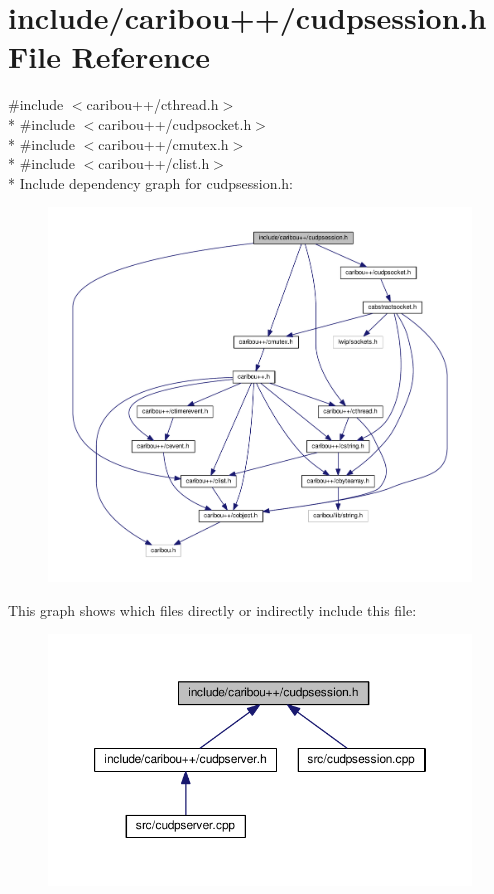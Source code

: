\section{include/caribou++/cudpsession.h File Reference}
\label{cudpsession_8h}
{\ttfamily \#include $<$caribou++/cthread.\-h$>$}\\*
{\ttfamily \#include $<$caribou++/cudpsocket.\-h$>$}\\*
{\ttfamily \#include $<$caribou++/cmutex.\-h$>$}\\*
{\ttfamily \#include $<$caribou++/clist.\-h$>$}\\*
Include dependency graph for cudpsession.\-h\-:\nopagebreak
\begin{figure}[H]
\begin{center}
\leavevmode
\includegraphics[width=350pt]{cudpsession_8h__incl}
\end{center}
\end{figure}
This graph shows which files directly or indirectly include this file\-:\nopagebreak
\begin{figure}[H]
\begin{center}
\leavevmode
\includegraphics[width=350pt]{cudpsession_8h__dep__incl}
\end{center}
\end{figure}
